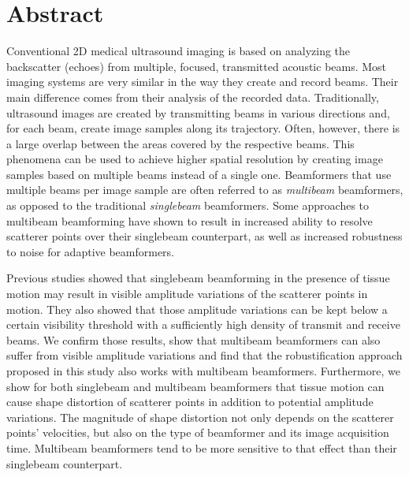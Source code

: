 
\chapter*{Abstract}
Conventional 2D medical ultrasound imaging is based on analyzing the backscatter 
(echoes) from multiple, focused, transmitted acoustic beams.
Most imaging systems are very similar in the way they create and record beams. Their main difference comes from their analysis of the recorded data.
Traditionally, ultrasound images are created by transmitting beams in various directions and, for each beam, create image samples along its trajectory.
Often, however, there is a large overlap between the areas covered by the respective beams.
This phenomena can be used to achieve higher spatial resolution by creating image samples based on multiple beams instead of a single one.
Beamformers that use multiple beams per image sample are often referred to as \textit{multibeam} beamformers, as opposed to the traditional \textit{singlebeam} beamformers.
Some approaches to multibeam beamforming have shown to result in increased ability to resolve scatterer points over their singlebeam counterpart, as well as increased robustness to noise for adaptive beamformers.

Previous studies showed that singlebeam beamforming in the presence of tissue motion may result in visible amplitude variations of the scatterer points in motion. 
They also showed that those amplitude variations can be kept below a certain visibility threshold with a sufficiently high density of transmit and receive beams.
We confirm those results, show that multibeam beamformers can also suffer from visible amplitude variations and find that the robustification approach proposed in this study also works with multibeam beamformers.
Furthermore, we show for both singlebeam and multibeam beamformers that tissue motion can cause shape distortion of scatterer points in addition to potential amplitude variations.
The magnitude of shape distortion not only depends on the scatterer points' velocities, but also on the type of beamformer and its image acquisition time.
Multibeam beamformers tend to be more sensitive to that effect than their singlebeam counterpart.

